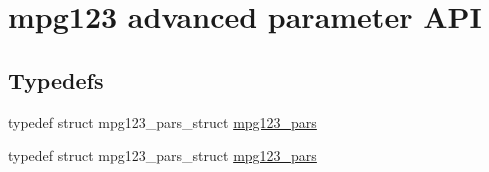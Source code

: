 \hypertarget{group__mpg123__advpar}{}\section{mpg123 advanced parameter A\+PI}
\label{group__mpg123__advpar}
\subsection*{Typedefs}
\begin{DoxyCompactItemize}
\item 
typedef struct mpg123\+\_\+pars\+\_\+struct \hyperlink{group__mpg123__advpar_ga3983578625af3bb6dc7e3b74d0cab4aa}{mpg123\+\_\+pars}
\item 
typedef struct mpg123\+\_\+pars\+\_\+struct \hyperlink{group__mpg123__advpar_ga3983578625af3bb6dc7e3b74d0cab4aa}{mpg123\+\_\+pars}
\end{DoxyCompactItemize}
